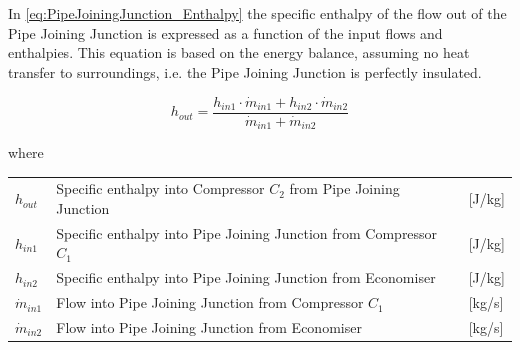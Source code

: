 In \cref{eq:PipeJoiningJunction_Enthalpy} the specific enthalpy of the flow out of the Pipe Joining Junction is expressed as a function of the input flows and enthalpies. This equation is based on the energy balance, assuming no heat transfer to surroundings, i.e. the Pipe Joining Junction is perfectly insulated.

\begin{equation} \label{eq:PipeJoiningJunction_Enthalpy}
	h_{out} = \frac{h_{in1} \cdot \dot{m}_{in1} + h_{in2} \cdot \dot{m}_{in2}}{ \dot{m}_{in1} + \dot{m}_{in2} }
\end{equation}

where

\begin{center}
	\begin{tabular}{l p{10cm} l}
		$h_{out}$ 	& Specific enthalpy into Compressor $ C_2 $ from Pipe Joining Junction 		& [\si{J}/\si{kg}]\\ 
		$h_{in1}$ 	& Specific enthalpy into Pipe Joining Junction from Compressor $ C_1 $  		& [\si{J}/\si{kg}]\\ 
		$h_{in2}$ 	& Specific enthalpy into Pipe Joining Junction from Economiser   			& [\si{J}/\si{kg}]\\ 
		$\dot{m}_{in1}$ & Flow into Pipe Joining Junction from Compressor $ C_1 $ 		& [\si{kg}/\si{s}]\\
		$\dot{m}_{in2}$ & Flow into Pipe Joining Junction from Economiser 				& [\si{kg}/\si{s}]\\
	\end{tabular}
\end{center}



